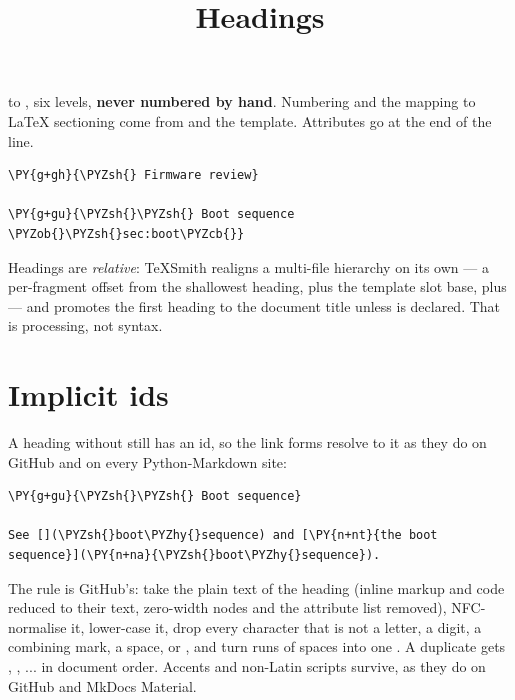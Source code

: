 \documentclass[a4paper,twoside]{article}
\title{Headings}
\author{}\date{}
\begin{document}
\maketitle
\tscodeinline{\#} to \tscodeinline{\#\#\#\#\#\#}, six levels, \textbf{never numbered by hand}. Numbering and the
mapping to \LaTeX{} sectioning come from  and the template.
Attributes go at the end of the line.
\begin{tscode}[lang=md, engine=pygments]
\begin{Verbatim}[commandchars=\\\{\},breaklines, breakanywhere, commandchars=\\\{\}]
\PY{g+gh}{\PYZsh{} Firmware review}

\PY{g+gu}{\PYZsh{}\PYZsh{} Boot sequence \PYZob{}\PYZsh{}sec:boot\PYZcb{}}
\end{Verbatim}
\end{tscode}
Headings are \emph{relative}: TeXSmith realigns a multi-file hierarchy on its own ---
a per-fragment offset from the shallowest heading, plus the template slot base,
plus  --- and promotes the first heading to the document title
unless  is declared. That is processing, not syntax.
\section{Implicit ids}
A heading without  still has an id, so the link forms resolve to it as
they do on GitHub and on every Python-Markdown site:
\begin{tscode}[lang=md, engine=pygments]
\begin{Verbatim}[commandchars=\\\{\},breaklines, breakanywhere, commandchars=\\\{\}]
\PY{g+gu}{\PYZsh{}\PYZsh{} Boot sequence}

See [](\PYZsh{}boot\PYZhy{}sequence) and [\PY{n+nt}{the boot sequence}](\PY{n+na}{\PYZsh{}boot\PYZhy{}sequence}).
\end{Verbatim}
\end{tscode}
The rule is GitHub's: take the plain text of the heading (inline markup and
code reduced to their text, zero-width nodes and the attribute list removed),
NFC-normalise it, lower-case it, drop every character that is not a letter, a
digit, a combining mark, a space, \tscodeinline{-\allowbreak{}} or \tscodeinline{\_}, and turn runs of spaces into one
\tscodeinline{-\allowbreak{}}. A duplicate gets , , ... in document order. Accents and non-Latin
scripts survive, as they do on GitHub and MkDocs Material.
\end{document}
